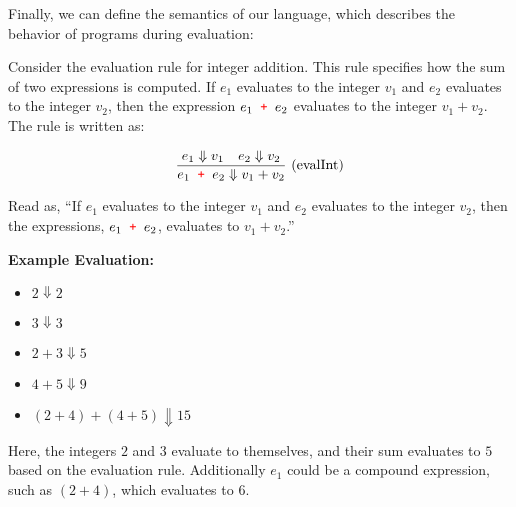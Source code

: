 \newpage 

\noindent
Finally, we can define the semantics of our language, which describes the behavior of programs during evaluation:

\begin{Example}

    \label{ex:eval_integer_addition}
    Consider the evaluation rule for integer addition. This rule specifies how the sum of two expressions is computed. 
    If $e_1$ evaluates to the integer $v_1$ and $e_2$ evaluates to the integer $v_2$, 
    then the expression $e_1 \texttt{\color{red}{ + }} e_2$ evaluates to the integer $v_1 + v_2$. The rule is written as: \LARGE

    \[
    \frac{e_1 \Downarrow v_1 \quad e_2 \Downarrow v_2}{e_1 \texttr{ + } e_2 \Downarrow v_1 + v_2} \ (\text{evalInt})
    \]

    \vspace{.5em}
    \normalsize
    \noindent
    Read as, ``If $e_1$ evaluates to the integer $v_1$ and $e_2$ evaluates to the integer $v_2$, 
    then the expressions, $e_1 \texttt{\color{red}{ + }} e_2$, evaluates to $v_1 + v_2$.''

    \vspace{1em}
    \textbf{Example Evaluation:}
    \begin{itemize}
        \item $2 \Downarrow 2$
        \item $3 \Downarrow 3$
        \item $2 + 3 \Downarrow 5$
        \item $4 + 5 \Downarrow 9$
        \item $(2 + 4) + (4 + 5) \Downarrow 15$
    \end{itemize}

    \noindent
    Here, the integers $2$ and $3$ evaluate to themselves, and their sum evaluates to $5$ based on the evaluation rule.
    Additionally $e_1$ could be a compound expression, such as $(2 + 4)$, which evaluates to $6$.
\end{Example}

